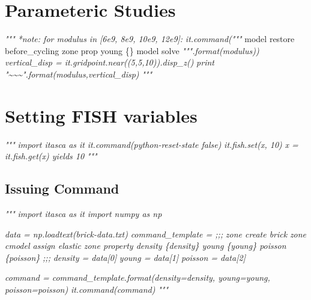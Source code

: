 \documentclass[a4paper, nobind]{templates/ociamthesis}
\newenvironment{Shaded}{\begin{snugshade}}{\end{snugshade}}
\newcommand{\CommentTok}[1]{\textcolor[rgb]{0.56,0.35,0.01}{\textit{#1}}}
\newcommand{\NormalTok}[1]{#1}
\newcommand{\StringTok}[1]{\textcolor[rgb]{0.31,0.60,0.02}{#1}}
\renewenvironment{Shaded}
{
  \vspace{10pt}%
  \begin{snugshade}%
}{%
  \end{snugshade}%
  \vspace{8pt}%
}
\begin{document}
\hypertarget{parameteric-studies}{%
\section{Parameteric Studies}\label{parameteric-studies}}

\begin{Shaded}
\begin{Highlighting}[]
\CommentTok{"""}
\CommentTok{*note: for modulus in [6e9, 8e9, 10e9, 12e9]:}
\CommentTok{it.command("""}
\NormalTok{model restore }\StringTok{\textquotesingle{}before\_cycling\textquotesingle{}}
\NormalTok{zone prop young \{\}}
\NormalTok{model solve}
\CommentTok{""".format(modulus))}
\CommentTok{vertical\_disp = it.gridpoint.near((5,5,10)).disp\_z()}
\CommentTok{print "\textasciitilde{}\textasciitilde{}\textasciitilde{}".format(modulus,vertical\_disp)}
\CommentTok{"""}
\end{Highlighting}
\end{Shaded}

\hypertarget{setting-fish-variables}{%
\section{Setting FISH variables}\label{setting-fish-variables}}

\begin{Shaded}
\begin{Highlighting}[]
\CommentTok{"""}
\CommentTok{import itasca as it}
\CommentTok{it.command(\textquotesingle{}python{-}reset{-}state false\textquotesingle{})}
\CommentTok{it.fish.set(\textquotesingle{}x\textquotesingle{}, 10)}
\CommentTok{x = it.fish.get(\textquotesingle{}x\textquotesingle{}) yields 10}
\CommentTok{"""}
\end{Highlighting}
\end{Shaded}

\hypertarget{issuing-command}{%
\subsection{Issuing Command}\label{issuing-command}}

\begin{Shaded}
\begin{Highlighting}[]
\CommentTok{"""}
\CommentTok{import itasca as it}
\CommentTok{import numpy as np}

\CommentTok{data = np.loadtext(\textquotesingle{}brick{-}data.txt\textquotesingle{})}
\CommentTok{command\_template = ;;; }
\CommentTok{zone create brick}
\CommentTok{zone cmodel assign elastic}
\CommentTok{zone property density \{density\} young \{young\} poisson \{poisson\}}
\CommentTok{;;;}
\CommentTok{density = data[0]}
\CommentTok{young = data[1]}
\CommentTok{poisson = data[2]}

\CommentTok{command = command\_template.format(density=density, young=young, poisson=poisson)}
\CommentTok{it.command(command)}
\CommentTok{"""}
\end{Highlighting}
\end{Shaded}
\end{document}

